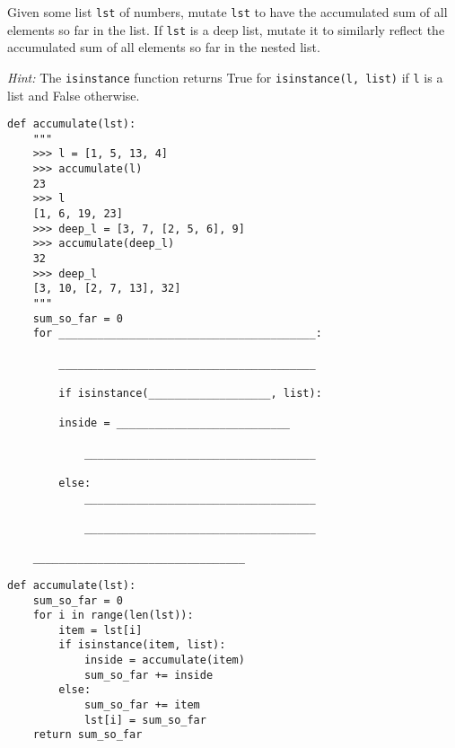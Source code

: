 \begin{blocksection}
\question Given some list \lstinline{lst} of numbers, mutate \lstinline{lst} to have the accumulated sum of all elements so far in the list. If \lstinline{lst} is a deep list, mutate it to similarly reflect the accumulated sum of all elements so far in the nested list. 

\emph{Hint:} The \lstinline$isinstance$ function returns True for \lstinline$isinstance(l, list)$ if \texttt{l} is a list and False otherwise.

\begin{lstlisting}
def accumulate(lst):
    """
    >>> l = [1, 5, 13, 4]
    >>> accumulate(l)
    23
    >>> l
    [1, 6, 19, 23]
    >>> deep_l = [3, 7, [2, 5, 6], 9]
    >>> accumulate(deep_l)
    32
    >>> deep_l
    [3, 10, [2, 7, 13], 32]
    """
    sum_so_far = 0
    for ________________________________________:

	    ________________________________________

        if isinstance(___________________, list):

	    inside = ___________________________

            ____________________________________

        else:
            ____________________________________

            ____________________________________
    
    _________________________________
\end{lstlisting}
\end{blocksection}

\begin{blocksection}
\begin{solution}[1in]
\begin{lstlisting}
def accumulate(lst):
    sum_so_far = 0
    for i in range(len(lst)):
        item = lst[i]
        if isinstance(item, list):
            inside = accumulate(item)
            sum_so_far += inside
        else:
            sum_so_far += item
            lst[i] = sum_so_far
    return sum_so_far
\end{lstlisting}
\end{solution}
\end{blocksection}


